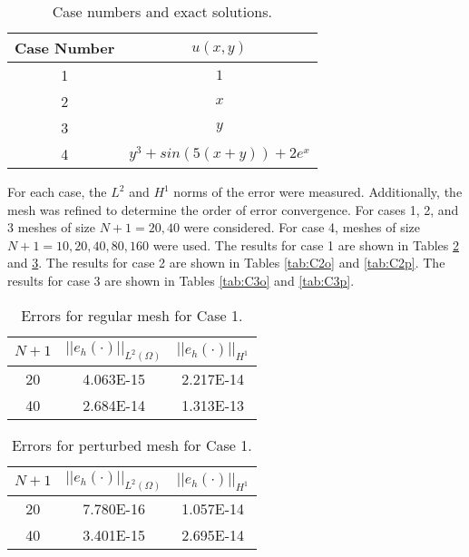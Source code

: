 \documentclass[a4paper, 12pt]{article}
\begin{document}
\begin{table}[!ht]
\caption{ Case numbers and exact solutions.}
\vspace{0.1in}
\centering
\begin{tabular}{ |c|c|}
  \hline
  Case Number  & $u( x,y)$ \\
  \hline
  1            &  $1$ \\
  \hline
  2            &  $x$ \\
  \hline
  3            &  $y$ \\
  \hline
  4            &  $y^3 + sin( 5(x+y)) + 2e^x$ \\
  \hline
\end{tabular}
\label{t:cases}
\end{table}

\noindent
For each case, the $L^2$ and $H^1$ norms of the error were measured. 
Additionally, the mesh was refined to determine the order of 
error convergence. For cases 1, 2, and 3 meshes of size $N+1 = 20, 40$
were considered. For case 4, meshes of size $N+1 = 10, 20, 40, 80, 160$
were used.
The results for case 1 are shown in Tables \ref{tab:C1o}
and \ref{tab:C1p}.
The results for case 2 are shown in Tables \ref{tab:C2o}
and \ref{tab:C2p}.
The results for case 3 are shown in Tables \ref{tab:C3o}
and \ref{tab:C3p}.

\begin{table}[!ht]
\caption{Errors for regular mesh for Case 1.}
\vspace{0.1in}
\centering
\begin{tabular}{|c|c|c|}
\hline
 $N+1$&  $||e_h(\cdot)||_{L^2(\Omega)}$ & $||e_h(\cdot)||_{H^1}$ \\
 \hline
     20  & 4.063E-15 & 2.217E-14 \\
     40  & 2.684E-14 & 1.313E-13 \\
\hline
\end{tabular}
\label{tab:C1o}
\end{table}

\begin{table}[!ht]
\caption{Errors for perturbed mesh for Case 1.}
\vspace{0.1in}
\centering
\begin{tabular}{|c|c|c|}
\hline
 $N+1$  & $||e_h(\cdot)||_{L^2(\Omega)}$ & $||e_h(\cdot)||_{H^1}$ \\
 \hline
     20  & 7.780E-16 & 1.057E-14 \\
     40  & 3.401E-15 & 2.695E-14 \\
\hline
\end{tabular}
\label{tab:C1p}
\end{table}
\end{document}
